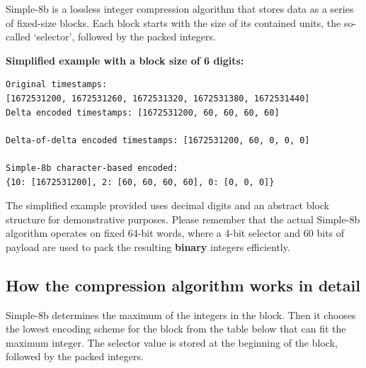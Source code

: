 Simple-8b is a lossless integer compression algorithm that stores data as a
series of fixed-size blocks. Each block starts with the size of its contained
units, the so-called `selector', followed by the packed integers.

\textbf{Simplified example with a block size of 6 digits:}

\begin{verbatim}
Original timestamps:
[1672531200, 1672531260, 1672531320, 1672531380, 1672531440]
Delta encoded timestamps: [1672531200, 60, 60, 60, 60]

Delta-of-delta encoded timestamps: [1672531200, 60, 0, 0, 0]

Simple-8b character-based encoded: 
{10: [1672531200], 2: [60, 60, 60, 60], 0: [0, 0, 0]}
\end{verbatim}

\begin{tcolorbox}[
    colback=red!5!white, %
    colframe=red!75!black, %
    title=\textbf{Important Simplification Note}, %
    fonttitle=\bfseries\sffamily, %
    boxsep=5pt, %
    arc=4pt, %
    boxrule=0.5pt %
  ]
  The simplified example provided uses decimal digits and an abstract block structure for demonstrative purposes. Please remember that the actual Simple-8b algorithm operates on fixed 64-bit words, where a 4-bit selector and 60 bits of payload are used to pack the resulting \textbf{binary} integers efficiently.
\end{tcolorbox}

\subsection{How the compression algorithm works in detail}

Simple-8b determines the maximum of the integers in the block. Then it chooses
the lowest encoding scheme for the block from the table below that can fit the
maximum integer. The selector value is stored at the beginning of the block,
followed by the packed integers.

\begin{table}[ht]
  \centering
  \small
  \caption{Encoding mode for Simple-8 scheme. Between 1 and 240 integers are coded with one 64-bit word.}
\end{table}

